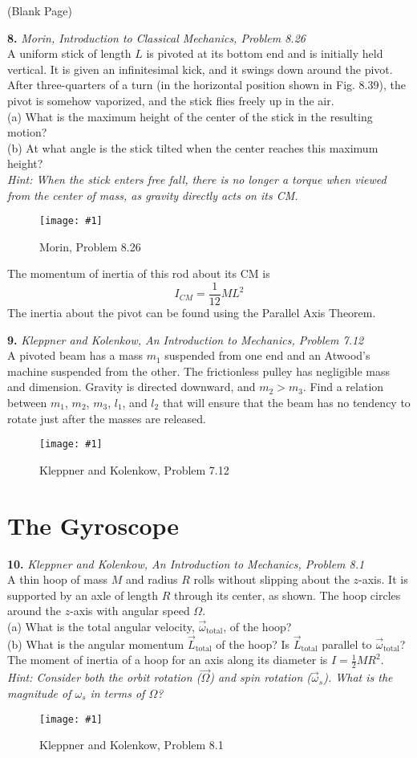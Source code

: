 \documentclass[11pt]{article}
\newcommand{\fig}[4]{
    \begin{figure}[H]
        \centering
        \texttt{[image: \#1]}
        \caption{#2}
        \label{exp4fit}
    \end{figure}
}
\theoremstyle{gangnamstyle}{\newtheorem{definition}{Definition}[]}
\theoremstyle{gangnamstyle}{\newtheorem{example}{Example}[]}
\theoremstyle{gangnamstyle}{\newtheorem{problem}{Problem}[]}
\begin{document}
\pagebreak

\begin{center}
(Blank Page)
\end{center}

\pagebreak

\textbf{8.} \textit{Morin, Introduction to Classical Mechanics, Problem 8.26} \\
A uniform stick of length $L$ is pivoted at its bottom end and is initially held vertical. It is given an infinitesimal kick, and it swings down around the pivot. After three-quarters of a turn (in the horizontal position shown in Fig. 8.39), the pivot is somehow vaporized, and the stick flies freely up in the air. \\
(a) What is the maximum height of the center of the stick in the resulting motion? \\
(b) At what angle is the stick tilted when the center reaches this maximum height? \\
\textit{Hint: When the stick enters free fall, there is no longer a torque when viewed from the center of mass, as gravity directly acts on its CM.}
\fig{figs/0718/m826.png}{Morin, Problem 8.26}{0.5}{0}
The momentum of inertia of this rod about its CM is
\[ I_{CM} = \frac{1}{12}ML^2 \]
The inertia about the pivot can be found using the Parallel Axis Theorem. 

\pagebreak

\textbf{9.} \textit{Kleppner and Kolenkow, An Introduction to Mechanics, Problem 7.12} \\
A pivoted beam has a mass $m_1$ suspended from one end and an Atwood’s machine suspended from the other. The frictionless pulley has negligible mass and dimension. Gravity is directed downward, and $m_2 > m_3$. Find a relation between $m_1$, $m_2$, $m_3$, $l_1$, and $l_2$ that will ensure that the beam has no tendency to rotate just after the masses are released. 
\fig{figs/0718/kk712.png}{Kleppner and Kolenkow, Problem 7.12}{0.6}{0}

\pagebreak

\section{The Gyroscope}
\textbf{10.} \textit{Kleppner and Kolenkow, An Introduction to Mechanics, Problem 8.1} \\
A thin hoop of mass $M$ and radius $R$ rolls without slipping about the $z$-axis. It is supported by an axle of length $R$ through its center, as shown. The hoop circles around the $z$-axis with angular speed $\Omega$. \\
(a) What is the total angular velocity, $\Vec{\omega}_{\text{total}}$, of the hoop? \\
(b) What is the angular momentum $\Vec{L}_{\text{total}}$ of the hoop? Is $\Vec{L}_{\text{total}}$ parallel to $\Vec{\omega}_{\text{total}}$? \\
The moment of inertia of a hoop for an axis along its diameter is $I = \frac{1}{2}MR^2$. \\
\textit{Hint: Consider both the orbit rotation ($\Vec{\Omega}$) and spin rotation ($\Vec{\omega}_s$). What is the magnitude of $\omega_s$ in terms of $\Omega$?}
\fig{figs/0718/kk81.png}{Kleppner and Kolenkow, Problem 8.1}{0.5}{0}
\end{document}
